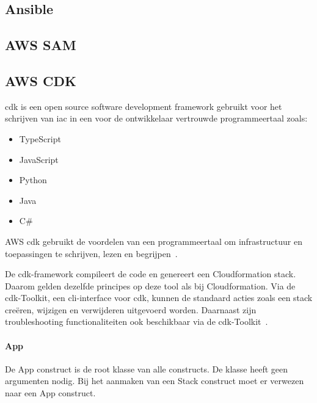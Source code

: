 \subsection{Ansible}
\label{subsec:service-ansible}


\subsection{AWS SAM}
\label{subsec:service-sam}


\subsection{AWS CDK}
\label{subsec:service-cdk}

\acrfull{cdk} is een open source software development framework gebruikt voor het schrijven van \acrfull{iac} in een voor de ontwikkelaar vertrouwde programmeertaal zoals:

\begin{itemize}
    \item TypeScript
    \item JavaScript
    \item Python
    \item Java
    \item C\#
\end{itemize}

AWS \acrshort{cdk} gebruikt de voordelen van een programmeertaal om infrastructuur en toepassingen te schrijven, lezen en begrijpen~\autocite{Mansoor2014}.

De \acrshort{cdk}-framework compileert de code en genereert een Cloudformation stack.
Daarom gelden dezelfde principes op deze tool als bij Cloudformation.
Via de \acrshort{cdk}-Toolkit, een \acrshort{cli}-interface voor \acrshort{cdk}, kunnen de standaard acties zoals een stack creëren, wijzigen en verwijderen uitgevoerd worden.
Daarnaast zijn troubleshooting functionaliteiten ook beschikbaar via de \acrshort{cdk}-Toolkit~\autocite{Mansoor2014}.

\paragraph{App}

De App construct is de root klasse van alle constructs.
De klasse heeft geen argumenten nodig.
Bij het aanmaken van een Stack construct moet er verwezen naar een App construct.

